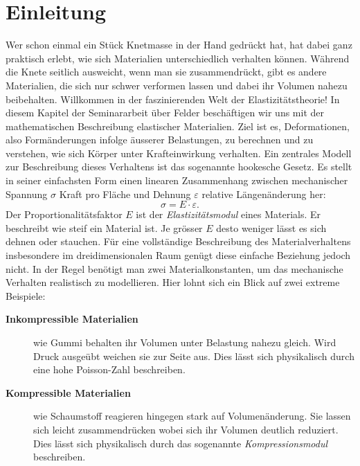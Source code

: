 %
%
%
%
\section{Einleitung}
\label{elastomechanik:section:Einleitung}
%
Wer schon einmal ein Stück Knetmasse in der Hand gedrückt hat, hat
dabei ganz praktisch erlebt, wie sich Materialien unterschiedlich
verhalten können.
Während die Knete seitlich ausweicht, wenn man sie zusammendrückt,
%
gibt es andere Materialien, die sich nur schwer verformen lassen und
dabei ihr Volumen nahezu beibehalten.
Willkommen in der faszinierenden Welt der Elastizitätstheorie!
In diesem Kapitel der Seminararbeit über Felder beschäftigen wir
uns mit der mathematischen Beschreibung elastischer Materialien.
%
Ziel ist es, Deformationen, also Formänderungen infolge äusserer
Belastungen, zu berechnen und zu verstehen, wie sich Körper unter
Krafteinwirkung verhalten.
%
Ein zentrales Modell zur Beschreibung dieses Verhaltens ist das sogenannte
hookesche Gesetz.
%
%
Es stellt in seiner einfachsten Form einen linearen Zusammenhang
zwischen mechanischer Spannung $\sigma$ Kraft pro Fläche und Dehnung
$\varepsilon$ relative Längenänderung her:
	\begin{equation*}
		\sigma = 
		E \cdot \varepsilon.
	\end{equation*}
Der Proportionalitätsfaktor $E$ ist der \emph{Elastizitätsmodul}
eines Materials.
%
Er beschreibt wie steif ein Material ist.
Je grösser $E$ desto weniger lässt es sich dehnen oder stauchen.
Für eine vollständige Beschreibung des Materialverhaltens insbesondere
im dreidimensionalen Raum genügt diese einfache Beziehung jedoch
nicht.
In der Regel benötigt man zwei Materialkonstanten,
um das mechanische Verhalten realistisch zu modellieren.
Hier lohnt sich ein Blick auf zwei extreme Beispiele:
\begin{description}
\item[\textbf{Inkompressible Materialien}] wie Gummi behalten ihr
Volumen unter Belastung nahezu gleich.
%
Wird Druck ausgeübt weichen sie zur Seite aus.
Dies lässt sich physikalisch durch eine hohe Poisson-Zahl beschreiben.
%
\item[\textbf{Kompressible Materialien}] wie Schaumstoff reagieren
hingegen stark auf Volumenänderung.
%
Sie lassen sich leicht zusammendrücken wobei sich ihr Volumen
deutlich reduziert.
Dies lässt sich physikalisch durch das sogenannte \emph{Kompressionsmodul}
beschreiben.
%
\end{description}


